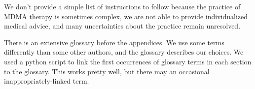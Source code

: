\documentclass[12pt,letterpaper]{book}
\begin{document}


We don't provide a simple list of instructions to follow because the practice of MDMA therapy is sometimes complex, we are not able to provide individualized medical advice, and many uncertainties about the practice remain unresolved.

There is an extensive \hyperref[sec:glossary]{glossary} before the appendices. We use some terms differently than some other authors, and the glossary describes our choices. We used a python script to link the first occurrences of glossary terms in each section to the glossary. This works pretty well, but there may an occasional inappropriately-linked term.
\end{document}
